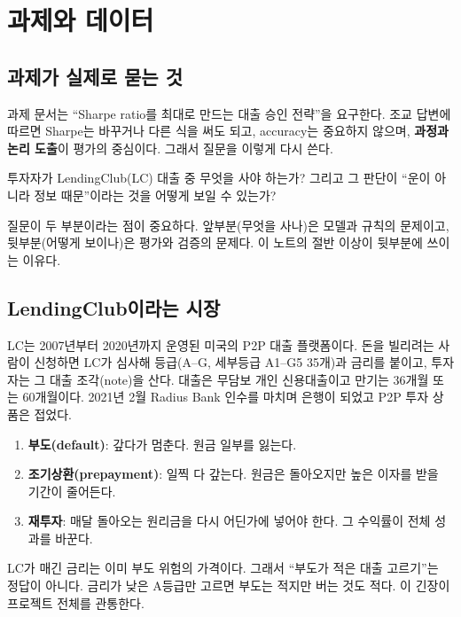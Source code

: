 \chapter{과제와 데이터}

\section{과제가 실제로 묻는 것}
과제 문서는 ``Sharpe ratio를 최대로 만드는 대출 승인 전략''을 요구한다. 조교 답변에 따르면 Sharpe는 바꾸거나 다른 식을 써도 되고, accuracy는 중요하지 않으며, \textbf{과정과 논리 도출}이 평가의 중심이다. 그래서 질문을 이렇게 다시 쓴다.

\begin{keybox}[이 프로젝트의 질문]
투자자가 LendingClub(LC) 대출 중 무엇을 사야 하는가? 그리고 그 판단이 ``운이 아니라 정보 때문''이라는 것을 어떻게 보일 수 있는가?
\end{keybox}

질문이 두 부분이라는 점이 중요하다. 앞부분(무엇을 사나)은 모델과 규칙의 문제이고, 뒷부분(어떻게 보이나)은 평가와 검증의 문제다. 이 노트의 절반 이상이 뒷부분에 쓰이는 이유다.

\section{LendingClub이라는 시장}
LC는 2007년부터 2020년까지 운영된 미국의 P2P 대출 플랫폼이다. 돈을 빌리려는 사람이 신청하면 LC가 심사해 등급(A--G, 세부등급 A1--G5 35개)과 금리를 붙이고, 투자자는 그 대출 조각(note)을 산다. 대출은 무담보 개인 신용대출이고 만기는 36개월 또는 60개월이다. 2021년 2월 Radius Bank 인수를 마치며 은행이 되었고 P2P 투자 상품은 접었다.

\begin{insight}
\begin{enumerate}[leftmargin=*]
\item \textbf{부도(default)}: 갚다가 멈춘다. 원금 일부를 잃는다.
\item \textbf{조기상환(prepayment)}: 일찍 다 갚는다. 원금은 돌아오지만 높은 이자를 받을 기간이 줄어든다.
\item \textbf{재투자}: 매달 돌아오는 원리금을 다시 어딘가에 넣어야 한다. 그 수익률이 전체 성과를 바꾼다.
\end{enumerate}
\end{insight}

LC가 매긴 금리는 이미 부도 위험의 가격이다. 그래서 ``부도가 적은 대출 고르기''는 정답이 아니다. 금리가 낮은 A등급만 고르면 부도는 적지만 버는 것도 적다. 이 긴장이 프로젝트 전체를 관통한다.

